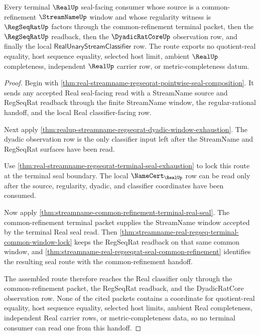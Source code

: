 \begin{theorem}
\label{thm:real-streamname-regseqrat-common-refinement-consumer-lock}
Every terminal $\RealUp$ seal-facing consumer whose source is a common-refinement $\StreamNameUp$ window and whose regularity witness is $\RegSeqRatUp$ factors through the common-refinement terminal packet, then the $\RegSeqRatUp$ readback, then the $\DyadicRatCoreUp$ observation row, and finally the local $\mathsf{RealUnaryStreamClassifier}$ row. The route exports no quotient-real equality, host sequence equality, selected host limit, ambient $\RealUp$ completeness, independent $\RealUp$ carrier row, or metric-completeness datum.
\end{theorem}
\begin{proof}
Begin with \autoref{thm:real-streamname-regseqrat-pointwise-seal-composition}. It sends any accepted Real seal-facing read with a StreamName source and RegSeqRat readback through the finite StreamName window, the regular-rational handoff, and the local Real classifier-facing row.

Next apply \autoref{thm:realup-streamname-regseqrat-dyadic-window-exhaustion}. The dyadic observation row is the only classifier input left after the StreamName and RegSeqRat surfaces have been read.

Use \autoref{thm:real-streamname-regseqrat-terminal-seal-exhaustion} to lock this route at the terminal seal boundary. The local $\NameCert_{\RealUp}$ row can be read only after the source, regularity, dyadic, and classifier coordinates have been consumed.

Now apply \autoref{thm:streamname-common-refinement-terminal-real-seal}. The common-refinement terminal packet supplies the StreamName window accepted by the terminal Real seal read. Then \autoref{thm:streamname-real-regseq-terminal-common-window-lock} keeps the RegSeqRat readback on that same common window, and \autoref{thm:streamname-real-regseqrat-seal-common-refinement} identifies the resulting seal route with the common-refinement handoff.

The assembled route therefore reaches the Real classifier only through the common-refinement packet, the RegSeqRat readback, and the DyadicRatCore observation row. None of the cited packets contains a coordinate for quotient-real equality, host sequence equality, selected host limits, ambient Real completeness, independent Real carrier rows, or metric-completeness data, so no terminal consumer can read one from this handoff.
\end{proof}

